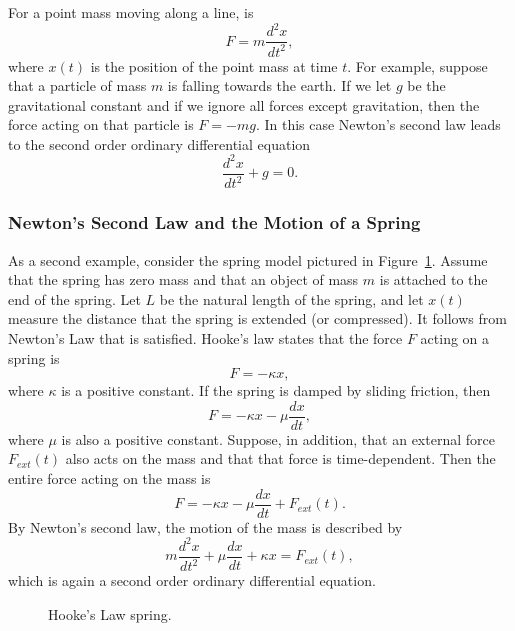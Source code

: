 For a point mass moving along a line,  is
\begin{equation} \label{E:F=ma}
F=m\frac{d^2x}{dt^2},
\end{equation}
where $x(t)$ is the position of the point mass at time $t$.
For example, suppose that a particle of mass $m$ is falling towards
the earth.  If we let $g$ be the gravitational constant and if we
ignore all forces except gravitation, then the force acting on that
particle is $F=-mg$.  In this case Newton's second law leads to the
second order ordinary differential equation
\begin{equation} \label{e:pointpart}
\frac{d^2x}{dt^2}+g=0.
\end{equation}

\subsubsection*{Newton's Second Law and the Motion of a Spring}
 

As a second example, consider the spring model pictured in
Figure~\ref{F:spring2}.  Assume that the spring has zero mass and that
an object of mass $m$ is attached to the end of the spring.  Let $L$ be
the natural length of the spring, and let $x(t)$ measure the distance
that the spring is extended (or compressed).  It follows from Newton's
Law that  is satisfied.  Hooke's law 
states that the force $F$ acting on a spring is
\[
 F = -\kappa x,
\]
where $\kappa$ is a positive constant.  If the spring is damped by
sliding friction, then
\[
F=-\kappa x - \mu \frac{dx}{dt},
\]
where $\mu$ is also a positive constant.  Suppose, in addition, that
an external force $F_{ext}(t)$ also acts on the
mass and that that
force is time-dependent.  Then the entire force acting on the mass is
\[
F=-\kappa x - \mu \frac{dx}{dt}+F_{ext}(t).
\]
By Newton's second law, the motion of the mass is described by
\begin{equation}  \label{e:springeq}
m\frac{d^2x}{dt^2} + \mu\frac{dx}{dt} + \kappa x = F_{ext}(t),
\end{equation}
which is again a second order ordinary differential equation.
\begin{figure}[thb]
      \centerline{%
      }
      \caption{Hooke's Law spring.}
      \label{F:spring2}
\end{figure}


